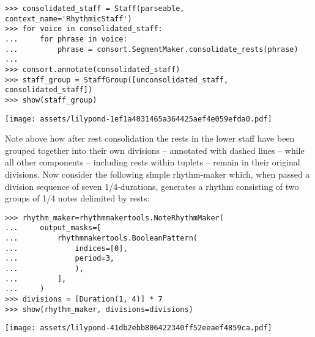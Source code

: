 \begin{abjadbookoutput}
\begin{singlespacing}
\vspace{-0.5\baselineskip}
\begin{lstlisting}
>>> consolidated_staff = Staff(parseable, context_name='RhythmicStaff')
>>> for voice in consolidated_staff:
...     for phrase in voice:
...         phrase = consort.SegmentMaker.consolidate_rests(phrase)
...
>>> consort.annotate(consolidated_staff)
>>> staff_group = StaffGroup([unconsolidated_staff, consolidated_staff])
>>> show(staff_group)
\end{lstlisting}
\noindent\texttt{[image: assets/lilypond-1ef1a4031465a364425aef4e059efda0.pdf]}
\end{singlespacing}
\end{abjadbookoutput}

\noindent Note above how after rest consolidation the rests in the lower staff have been grouped
together into their own divisions -- annotated with dashed lines -- while all
other components -- including rests within tuplets -- remain in their original
divisions. Now consider the following simple rhythm-maker which, when passed a
division sequence of seven 1/4-durations, generates a rhythm consisting
of two groups of 1/4 notes delimited by rests:

\begin{comment}
<abjad>
rhythm_maker=rhythmmakertools.NoteRhythmMaker(
    output_masks=[
        rhythmmakertools.BooleanPattern(
            indices=[0],
            period=3,
            ),
        ],
    )
divisions = [Duration(1, 4)] * 7
show(rhythm_maker, divisions=divisions)
</abjad>
\end{comment}

\begin{abjadbookoutput}
\begin{singlespacing}
\vspace{-0.5\baselineskip}
\begin{lstlisting}
>>> rhythm_maker=rhythmmakertools.NoteRhythmMaker(
...     output_masks=[
...         rhythmmakertools.BooleanPattern(
...             indices=[0],
...             period=3,
...             ),
...         ],
...     )
>>> divisions = [Duration(1, 4)] * 7
>>> show(rhythm_maker, divisions=divisions)
\end{lstlisting}
\noindent\texttt{[image: assets/lilypond-41db2ebb806422340ff52eeaef4859ca.pdf]}
\end{singlespacing}
\end{abjadbookoutput}

